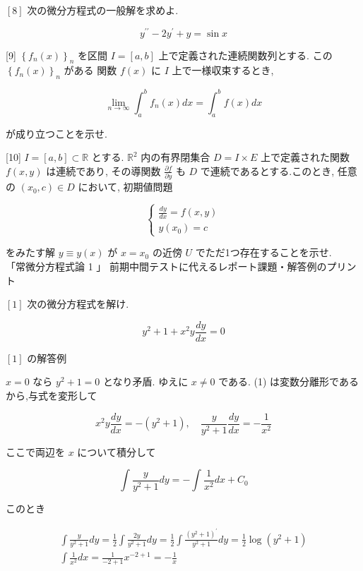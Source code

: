 \documentclass[10pt]{article}
\begin{document}
$[8]$ 次の微分方程式の一般解を求めよ.


\begin{equation*}
y^{\prime \prime}-2 y^{\prime}+y=\sin x \tag{11}
\end{equation*}


[9] $\left\{f_{n}(x)\right\}_{n}$ を区間 $I=[a, b]$ 上で定義された連続関数列とする. この $\left\{f_{n}(x)\right\}_{n}$ がある 関数 $f(x)$ に $I$ 上で一様収束するとき,


\begin{equation*}
\lim _{n \rightarrow \infty} \int_{a}^{b} f_{n}(x) d x=\int_{a}^{b} f(x) d x \tag{12}
\end{equation*}


が成り立つことを示せ.

[10] $I=[a, b] \subset \mathbb{R}$ とする. $\mathbb{R}^{2}$ 内の有界閉集合 $D=I \times E$ 上で定義された関数 $f(x, y)$ は連続であり, その導関数 $\frac{\partial f}{\partial y}$ も $D$ で連続であるとする.このとき, 任意の $\left(x_{0}, c\right) \in D$ において, 初期値問題

\[
\left\{\begin{array}{l}
\frac{d y}{d x}=f(x, y)  \tag{13}\\
y\left(x_{0}\right)=c
\end{array}\right.
\]

をみたす解 $y \equiv y(x)$ が $x=x_{0}$ の近傍 $U$ でただ1つ存在することを示せ.\\
「常微分方程式論 1 」 前期中間テストに代えるレポート課題・解答例のプリント

$[1]$ 次の微分方程式を解け.


\begin{equation*}
y^{2}+1+x^{2} y \frac{d y}{d x}=0 \tag{1}
\end{equation*}


$[1]$ の解答例

$x=0$ なら $y^{2}+1=0$ となり矛盾. ゆえに $x \neq 0$ である. (1) は変数分離形であるから,与式を変形して

$$
x^{2} y \frac{d y}{d x}=-\left(y^{2}+1\right), \quad \frac{y}{y^{2}+1} \frac{d y}{d x}=-\frac{1}{x^{2}}
$$

ここで両辺を $x$ について積分して


\begin{equation*}
\int \frac{y}{y^{2}+1} d y=-\int \frac{1}{x^{2}} d x+C_{0} \tag{*1}
\end{equation*}


このとき

$$
\begin{gathered}
\int \frac{y}{y^{2}+1} d y=\frac{1}{2} \int \frac{2 y}{y^{2}+1} d y=\frac{1}{2} \int \frac{\left(y^{2}+1\right)^{\prime}}{y^{2}+1} d y=\frac{1}{2} \log \left(y^{2}+1\right) \\
\int \frac{1}{x^{2}} d x=\frac{1}{-2+1} x^{-2+1}=-\frac{1}{x}
\end{gathered}
$$
\end{document}
